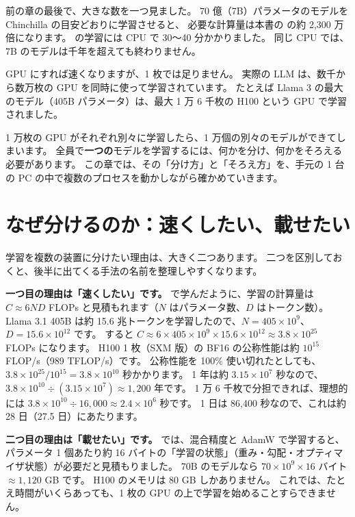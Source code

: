 前の章の最後で、大きな数を一つ見ました。
70 億（7B）パラメータのモデルを Chinchilla の目安どおりに学習させると、
必要な計算量は本書の  の約 2,300 万倍になります。
 の学習には CPU で 30〜40 分かかりました。
同じ CPU では、7B のモデルは千年を超えても終わりません。

GPU にすれば速くなりますが、1 枚では足りません。
実際の LLM は、数千から数万枚の GPU を同時に使って学習されています。
たとえば Llama 3 の最大のモデル（405B パラメータ）は、最大 1 万 6 千枚の H100 という GPU で学習されました\cite{dubey2024llama3}。

1 万枚の GPU がそれぞれ別々に学習したら、1 万個の別々のモデルができてしまいます。
全員で\textbf{一つの}モデルを学習するには、何かを分け、何かをそろえる必要があります。
この章では、その「分け方」と「そろえ方」を、手元の 1 台の PC の中で複数のプロセスを動かしながら確かめていきます。

\section{なぜ分けるのか：速くしたい、載せたい}\label{sec:dist-why}

学習を複数の装置に分けたい理由は、大きく二つあります。
二つを区別しておくと、後半に出てくる手法の名前を整理しやすくなります。

\textbf{一つ目の理由は「速くしたい」です。}
で学んだように、学習の計算量は $C\approx 6ND$ FLOPs と見積もれます（$N$ はパラメータ数、$D$ はトークン数）。
Llama 3.1 405B は約 15.6 兆トークンを学習したので、$N=405\times10^{9}$、$D=15.6\times10^{12}$ です。
すると $C\approx 6\times 405\times10^{9}\times 15.6\times10^{12}\approx 3.8\times 10^{25}$ FLOPs になります。
H100 1 枚（SXM 版）の BF16 の公称性能は約 $10^{15}$ FLOP/s（989 TFLOP/s）です。
公称性能を 100\% 使い切れたとしても、$3.8\times10^{25}/10^{15}=3.8\times10^{10}$ 秒かかります。
1 年は約 $3.15\times10^{7}$ 秒なので、$3.8\times10^{10}\div(3.15\times10^{7})\approx 1{,}200$ 年です。
1 万 6 千枚で分担できれば、理想的には $3.8\times10^{10}\div16{,}000\approx2.4\times10^{6}$ 秒です。
1 日は 86,400 秒なので、これは約 28 日（27.5 日）にあたります。

\textbf{二つ目の理由は「載せたい」です。}
では、混合精度と AdamW で学習すると、
パラメータ 1 個あたり約 16 バイトの「学習の状態」（重み・勾配・オプティマイザ状態）が必要だと見積もりました。
70B のモデルなら $70\times10^{9}\times16$ バイト $\approx 1{,}120$ GB です。
H100 のメモリは 80 GB しかありません。
これでは、たとえ時間がいくらあっても、1 枚の GPU の上で学習を始めることすらできません。

